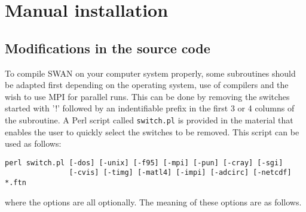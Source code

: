 \documentclass[12pt]{book}
\begin{document}
\section{Manual installation} \label{sec:manual}

\subsection{Modifications in the source code}

To compile SWAN on your computer system properly, some subroutines should be adapted first
depending on the operating system, use of compilers and the wish to use MPI for
parallel runs. This can be done by removing the switches started with '!' followed by an
indentifiable prefix in the first 3 or 4 columns of the subroutine. A Perl script called
{\tt switch.pl} is provided in the material that enables the user to quickly select the
switches to be removed. This script can be used as follows:
\begin{verbatim}
perl switch.pl [-dos] [-unix] [-f95] [-mpi] [-pun] [-cray] [-sgi]
               [-cvis] [-timg] [-matl4] [-impi] [-adcirc] [-netcdf] *.ftn
\end{verbatim}
where the options are all optionally. The meaning of these options are as follows.
\end{document}
